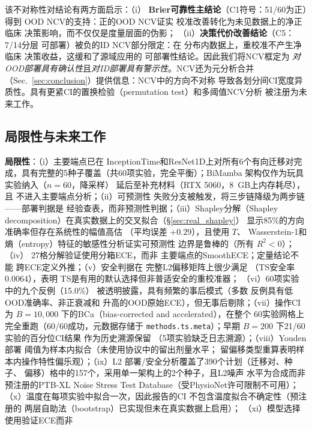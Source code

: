 该不对称性对结论有两方面启示：（i）
\textbf{Brier可靠性主结论}（C1符号：51/60为正）得到
OOD NCV的支持：正的OOD NCV证实
校准改善转化为未见数据上的净正临床
决策影响，而不仅仅是度量层面的伪影；
（ii）\textbf{决策代价改善结论}（C5：7/14分层
可部署）被负的ID NCV部分限定：在
分布内数据上，重校准不产生净临床
决策收益，这缓和了源域应用的
可部署性结论。因此我们将NCV框定为
\emph{对OOD部署具有确认性}且\emph{对ID部署具有警示性}。NCV还为元分析合并
（Sec.~\ref{sec:conclusion}）提供信息：NCV中的方向不对称
导致各划分间CI宽度异质性。具有更紧CI的置换检验（permutation test）和多阈值NCV分析
被注册为未来工作。

\subsection{局限性与未来工作}
\textbf{局限性}：（i）主要端点已在
InceptionTime和ResNet1D上对所有6个有向迁移对完成，具有完整的5种子覆盖（共60项实验，完全平衡）；BiMamba
架构仅作为玩具实验纳入（$n=60$，降采样）
延后至补充材料（RTX 5060，8~GB上内存耗尽），且
不进入主要端点分析；（ii）可预测性
失败分支被触发，将三步链降级为两步链——部署判据是
经验查表，而非预测性判据；（iii）Shapley分解（Shapley decomposition）在真实数据上的交叉拟合（\S\ref{sec:real_shapley}）
显示85\%的方向准确率但存在系统性的幅值高估
（平均误差 $+0.29$），且使用 $T$、
Wasserstein-1和熵（entropy）特征的敏感性分析证实可预测性
边界是鲁棒的（所有 $R^2 < 0$）；（iv）
27格分解验证使用分箱ECE，而非
主要端点的SmoothECE；定量结论不能
跨ECE定义外推；（v）安全判据在
完整L2偏移矩阵上很少满足
（TS安全率 $0.0064$），表明
TS是有用的默认选择但非普适安全的重校准器；
（vi）60项实验中的九个反例（15.0\%）
被透明披露，具有频繁的事后模式（多数
反例具有低OOD准确率、非正衰减和
升高的OOD原始ECE），但无事后剔除；（vii）操作CI为 $B=10{,}000$ 下的BCa（bias-corrected and accelerated），在整个
60实验网格上完全重跑（60/60成功，元数据存储于
\texttt{methods.ts.meta}）；早期 $B=200$ 下21/60实验的百分位CI结果
作为历史溯源保留
（5项实验缺乏日志溯源）；（viii）Youden部署
阈值为样本内拟合（未使用协议中的留出剂量水平；
留偏移类型重算表明样本内操作特性偏乐观）；（ix）L2
部署/安全分析覆盖了390个计划（迁移对、种子、
偏移）格中的157个，采用单一架构上的2个种子，且L2噪声
水平为合成而非预注册的PTB-XL Noise
Stress Test Database（受PhysioNet许可限制不可用）；
（x）温度在每项实验中拟合一次，因此报告的CI
不包含温度拟合不确定性（预注册的
两层自助法（bootstrap）已实现但未在真实数据上启用）；
（xi）模型选择使用验证ECE而非
